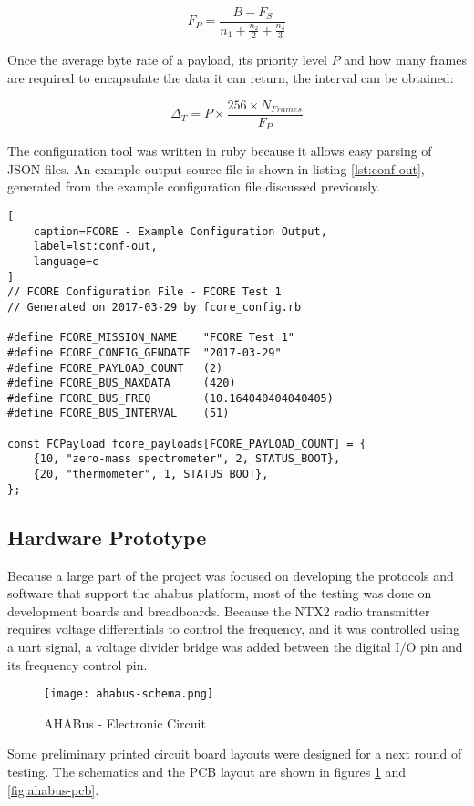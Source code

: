 \[F_P = \frac{B-F_S}{n_{1} + \frac{n_2}{2} + \frac{n_3}{3}} \]

Once the average byte rate of a payload, its priority level $P$ and how many
frames are required to encapsulate the data it can return, the interval can be
obtained:

\[ \Delta_T = P \times \frac{256 \times N_{Frames}}{F_P} \]

The configuration tool was written in ruby because it allows easy parsing of
JSON files. An example output source file is shown in listing 
\ref{lst:conf-out}, generated from the example configuration file discussed
previously.

\begin{lstlisting}[
    caption=FCORE - Example Configuration Output,
    label=lst:conf-out,
    language=c
]
// FCORE Configuration File - FCORE Test 1
// Generated on 2017-03-29 by fcore_config.rb

#define FCORE_MISSION_NAME    "FCORE Test 1"
#define FCORE_CONFIG_GENDATE  "2017-03-29"
#define FCORE_PAYLOAD_COUNT   (2)
#define FCORE_BUS_MAXDATA     (420)
#define FCORE_BUS_FREQ        (10.164040404040405)
#define FCORE_BUS_INTERVAL    (51)

const FCPayload fcore_payloads[FCORE_PAYLOAD_COUNT] = {
    {10, "zero-mass spectrometer", 2, STATUS_BOOT},
    {20, "thermometer", 1, STATUS_BOOT},
};
\end{lstlisting}

\subsection{Hardware Prototype}
\label{sec:flight-hardware}

Because a large part of the project was focused on developing the protocols and
software that support the \acrshort{ahabus} platform, most of the testing was
done on development boards and breadboards. Because the NTX2 radio transmitter
requires voltage differentials to control the frequency, and it was controlled
using a \acrshort{uart} signal, a voltage divider bridge was added between the
digital I/O pin and its frequency control pin.

\begin{figure}[H]
\texttt{[image: ahabus-schema.png]}
\centering
\caption{AHABus - Electronic Circuit}
\label{fig:ahabus-schema}
\end{figure}

Some preliminary printed circuit board layouts were designed for a next round
of testing. The schematics and the PCB layout are shown in figures
\ref{fig:ahabus-schema} and \ref{fig:ahabus-pcb}.

